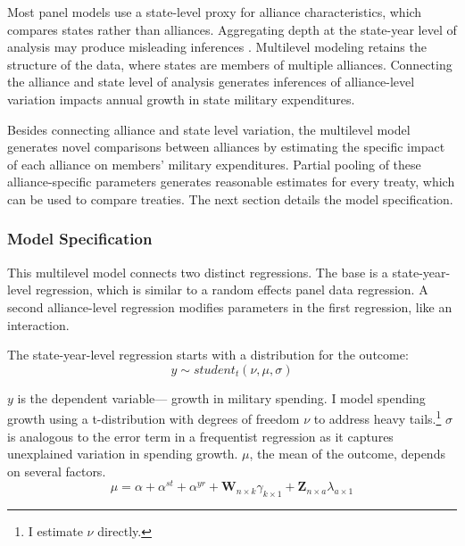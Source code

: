 \documentclass[12pt]{article}
\begin{document}
Most panel models use a state-level proxy for alliance characteristics, which compares states rather than alliances.
Aggregating depth at the state-year level of analysis may produce misleading inferences \citep{McElreath2016}.
Multilevel modeling retains the structure of the data, where states are members of multiple alliances. 
Connecting the alliance and state level of analysis generates inferences of alliance-level variation impacts annual growth in state military expenditures. 


Besides connecting alliance and state level variation, the multilevel model generates novel comparisons between alliances by estimating the specific impact of each alliance on members' military expenditures. 
Partial pooling of these alliance-specific parameters generates reasonable estimates for every treaty, which can be used to compare treaties. 
The next section details the model specification. 
 


\subsubsection{Model Specification} 

This multilevel model connects two distinct regressions. 
The base is a state-year-level regression, which is similar to a random effects panel data regression.
A second alliance-level regression modifies parameters in the first regression, like an interaction. 


The state-year-level regression starts with a distribution for the outcome:
\begin{equation}
y \sim student_t(\nu, \mu, \sigma)
\end{equation}
 

$y$ is the dependent variable--- growth in military spending. 
I model spending growth using a t-distribution with degrees of freedom $\nu$ to address heavy tails.\footnote{I estimate $\nu$ directly.}
$\sigma$ is analogous to the error term in a frequentist regression as it captures unexplained variation in spending growth.  
$\mu$, the mean of the outcome, depends on several factors.
\begin{equation}
\mu = \alpha + \alpha^{st} + \alpha^{yr} +\textbf{W}_{n \times k} \gamma_{k \times 1}  + \textbf{Z}_{n \times a} \lambda_{a \times 1} 
\end{equation}
\end{document}
